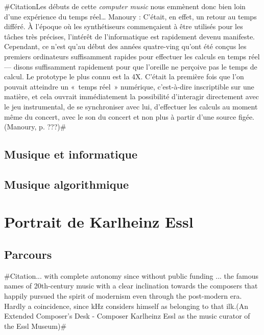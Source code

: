 \documentclass[a4paper,12pt]{article}
\newcommand{\guill}[1]{«~#1~»}
\newcommand{\zitat}[2]{\#Citation#1(#2)\#}
\begin{document}
\zitat{Les débuts de cette \emph{computer music} nous emmènent donc bien loin d'une expérience du temps réel\dots
Manoury : C'était, en effet, un retour au temps différé. À l'époque où les synthétiseurs commençaient à être utilisés pour les tâches très précises, l'intérêt de l'informatique est rapidement devenu manifeste. Cependant, ce n'est qu'au début des années quatre-ving qu'ont été conçus les premiers ordinateurs suffisamment rapides pour effectuer les calculs en temps réel --- disons suffisamment rapidement pour que l'oreille ne perçoive pas le temps de calcul. Le prototype le plus connu est la 4X. C'était la première fois que l'on pouvait atteindre un \guill{temps réel} numérique, c'est-à-dire inscriptible sur une matière, et cela ouvrait immédiatement la possibilité d'interagir directement avec le jeu instrumental, de se synchroniser avec lui, d'effectuer les calculs au moment même du concert, avec le son du concert et non plus à partir d'une source figée.}
{Manoury, p. ???}

\subsection*{Musique et informatique}

\subsection{Musique algorithmique}


\section{Portrait de Karlheinz Essl}

\subsection{Parcours}

\zitat{... with complete autonomy since without public funding
... the famous names of 20th-century music with a clear inclination towards the composers that happily pursued the spirit of modernism even through the post-modern era. Hardly a coincidence, since kHz considers himself as belonging to that ilk.}
{An Extended Composer’s Desk - Composer Karlheinz Essl as the music curator of the Essl Museum}
\end{document}

